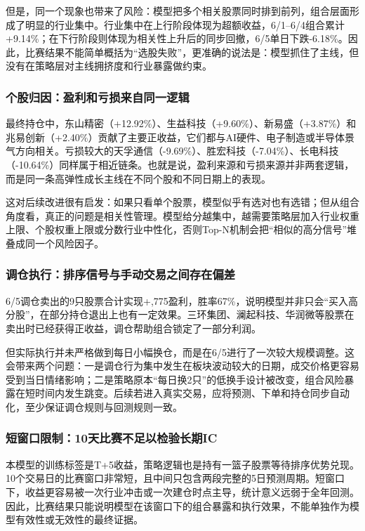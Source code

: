 \documentclass[10pt,a4paper]{ctexart}
\begin{document}
但是，同一个现象也带来了风险：模型把多个相关股票同时排到前列，组合层面形成了明显的行业集中。行业集中在上行阶段体现为超额收益，6/1--6/4组合累计+9.14\%；在下行阶段则体现为相关性上升后的同步回撤，6/5单日下跌-6.18\%。因此，比赛结果不能简单概括为“选股失败”，更准确的说法是：模型抓住了主线，但没有在策略层对主线拥挤度和行业暴露做约束。

\subsubsection{个股归因：盈利和亏损来自同一逻辑}

最终持仓中，东山精密（+12.92\%）、生益科技（+9.60\%）、新易盛（+3.87\%）和兆易创新（+2.40\%）贡献了主要正收益，它们都与AI硬件、电子制造或半导体景气方向相关。亏损较大的天孚通信（-9.69\%）、胜宏科技（-7.04\%）、长电科技（-10.64\%）同样属于相近链条。也就是说，盈利来源和亏损来源并非两套逻辑，而是同一条高弹性成长主线在不同个股和不同日期上的表现。

这对后续改进很有启发：如果只看单个股票，模型似乎有选对也有选错；但从组合角度看，真正的问题是相关性管理。模型给分越集中，越需要策略层加入行业权重上限、个股权重上限或分数行业中性化，否则Top-N机制会把“相似的高分信号”堆叠成同一个风险因子。

\subsubsection{调仓执行：排序信号与手动交易之间存在偏差}

6/5调仓卖出的9只股票合计实现+,775盈利，胜率67\%，说明模型并非只会“买入高分股”，在部分持仓退出上也有一定效果。三环集团、澜起科技、华润微等股票在卖出时已经获得正收益，调仓帮助组合锁定了一部分利润。

但实际执行并未严格做到每日小幅换仓，而是在6/5进行了一次较大规模调整。这会带来两个问题：一是调仓行为集中发生在板块波动较大的日期，成交价格更容易受到当日情绪影响；二是策略原本“每日换2只”的低换手设计被改变，组合风险暴露在短时间内发生跳变。后续若进入真实交易，应将预测、下单和持仓同步自动化，至少保证调仓规则与回测规则一致。

\subsubsection{短窗口限制：10天比赛不足以检验长期IC}

本模型的训练标签是T+5收益，策略逻辑也是持有一篮子股票等待排序优势兑现。10个交易日的比赛窗口非常短，且中间只包含两段完整的5日预测周期。短窗口下，收益更容易被一次行业冲击或一次建仓时点主导，统计意义远弱于全年回测。因此，比赛结果只能说明模型在该窗口下的组合暴露和执行效果，不能单独作为模型有效性或无效性的最终证据。
\end{document}
